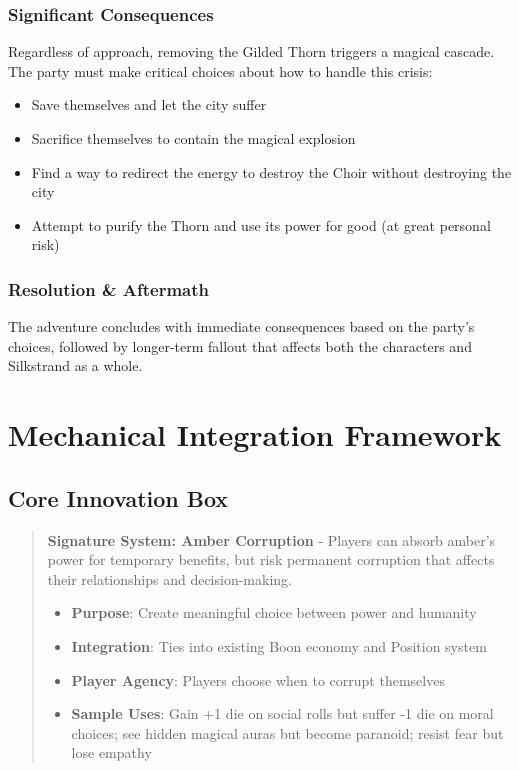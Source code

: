 \documentclass[11pt]{article}
\begin{document}
\subsubsection*{Significant Consequences}

Regardless of approach, removing the Gilded Thorn triggers a magical cascade. The party must make critical choices about how to handle this crisis:
\begin{itemize}
  \item Save themselves and let the city suffer
  \item Sacrifice themselves to contain the magical explosion
  \item Find a way to redirect the energy to destroy the Choir without destroying the city
  \item Attempt to purify the Thorn and use its power for good (at great personal risk)
\end{itemize}

\subsubsection*{Resolution \& Aftermath}

The adventure concludes with immediate consequences based on the party's choices, followed by longer-term fallout that affects both the characters and Silkstrand as a whole.

\section*{Mechanical Integration Framework}

\subsection*{Core Innovation Box}

\begin{quote}
\textbf{Signature System: Amber Corruption} - Players can absorb amber's power for temporary benefits, but risk permanent corruption that affects their relationships and decision-making.

\begin{itemize}
  \item \textbf{Purpose}: Create meaningful choice between power and humanity
  \item \textbf{Integration}: Ties into existing Boon economy and Position system
  \item \textbf{Player Agency}: Players choose when to corrupt themselves
  \item \textbf{Sample Uses}: Gain +1 die on social rolls but suffer -1 die on moral choices; see hidden magical auras but become paranoid; resist fear but lose empathy
\end{itemize}
\end{quote}
\end{document}
